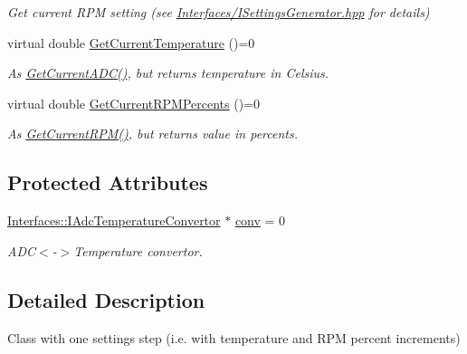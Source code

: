 \begin{DoxyCompactItemize}
\begin{DoxyCompactList}\small\item\em Get current R\+PM setting (see \hyperlink{_i_settings_generator_8hpp_source}{Interfaces/\+I\+Settings\+Generator.\+hpp} for details) \end{DoxyCompactList}\item 
virtual double \hyperlink{class_interfaces_1_1_i_settings_step_a62644690b7b63d27e72eca277a32bfdd}{Get\+Current\+Temperature} ()=0
\begin{DoxyCompactList}\small\item\em As \hyperlink{class_interfaces_1_1_i_settings_step_a54d5ce3350791e080bcb75d472376abf}{Get\+Current\+A\+D\+C()}, but returns temperature in Celsius. \end{DoxyCompactList}\item 
virtual double \hyperlink{class_interfaces_1_1_i_settings_step_abbbb49e91352212c6201a85f1a22253f}{Get\+Current\+R\+P\+M\+Percents} ()=0
\begin{DoxyCompactList}\small\item\em As \hyperlink{class_interfaces_1_1_i_settings_step_ac2b2370bf70fb09a9e1da4db922e8903}{Get\+Current\+R\+P\+M()}, but returns value in percents. \end{DoxyCompactList}\end{DoxyCompactItemize}
\subsection*{Protected Attributes}
\begin{DoxyCompactItemize}
\item 
\mbox{\label{class_interfaces_1_1_i_settings_step_a5db60ca3f2c1b4e7059910e2d86656b9}} 
\hyperlink{class_interfaces_1_1_i_adc_temperature_convertor}{Interfaces\+::\+I\+Adc\+Temperature\+Convertor} $\ast$ \hyperlink{class_interfaces_1_1_i_settings_step_a5db60ca3f2c1b4e7059910e2d86656b9}{conv} = 0
\begin{DoxyCompactList}\small\item\em A\+DC$<$-\/$>$Temperature convertor. \end{DoxyCompactList}\end{DoxyCompactItemize}


\subsection{Detailed Description}
Class with one settings step (i.\+e. with temperature and R\+PM percent increments) 

